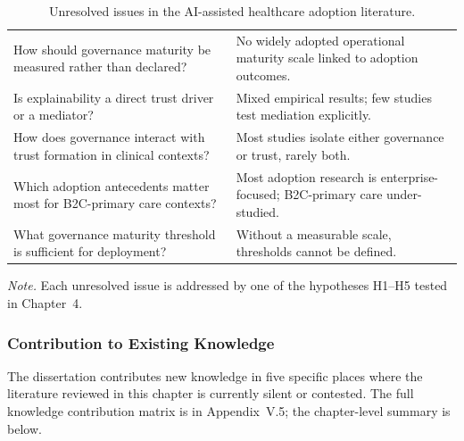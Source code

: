 {\tablestripes\tablefontsize
{}
\begin{xltabular}{\textwidth}{@{} >{\raggedright\arraybackslash}p{5cm} L @{}}
\caption[Unresolved issues in the AI-assisted healthcare adoption literature]{Unresolved issues in the AI-assisted healthcare adoption literature.}\label{tab:ch2_unresolved_issues} \\
\toprule
{} &  \\
\midrule
\endfirsthead
\endhead
\bottomrule
\endlastfoot
How should governance maturity be measured rather than declared? & No widely adopted operational maturity scale linked to adoption outcomes. \\
\addlinespace
Is explainability a direct trust driver or a mediator? & Mixed empirical results; few studies test mediation explicitly. \\
\addlinespace
How does governance interact with trust formation in clinical contexts? & Most studies isolate either governance or trust, rarely both. \\
\addlinespace
Which adoption antecedents matter most for B2C-primary care contexts? & Most adoption research is enterprise-focused; B2C-primary care under-studied. \\
\addlinespace
What governance maturity threshold is sufficient for deployment? & Without a measurable scale, thresholds cannot be defined. \\
\end{xltabular}}

\vspace{0.3em}\noindent\textit{Note.} Each unresolved issue is addressed by one of the hypotheses H1--H5 tested in Chapter~4.


\subsubsection{Contribution to Existing Knowledge}
\label{sec:ch2_knowledge_contribution_dedicated}

\noindent The dissertation contributes new knowledge in five specific places where the literature reviewed in this chapter is currently silent or contested. The full knowledge contribution matrix is in Appendix~V.5; the chapter-level summary is below.

